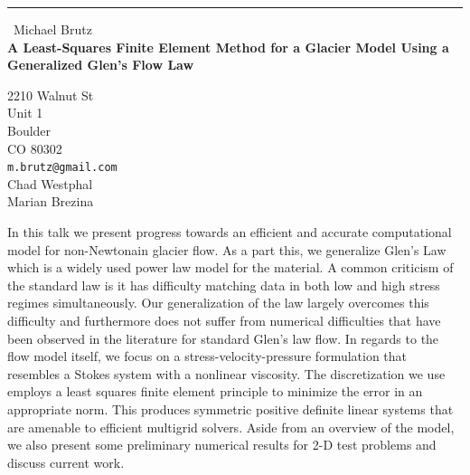 \documentclass{report}
\begin{document}
\begin{center}
\rule{6in}{1pt} \
{\large Michael Brutz \\
{\bf A Least-Squares Finite Element Method for a Glacier Model Using a Generalized Glen's Flow Law}}

2210 Walnut St \\ Unit 1 \\ Boulder \\ CO 80302
\\
{\tt m.brutz@gmail.com}\\
Chad Westphal\\
Marian Brezina\end{center}

In this talk we present progress towards an efficient and accurate
computational model for non-Newtonain glacier flow. As a part this, we
generalize Glen's Law which is a widely used power law model for the
material. A common criticism of the standard law is it has difficulty
matching data in both low and high stress regimes simultaneously. Our
generalization of the law largely overcomes this difficulty and
furthermore does not suffer from numerical difficulties that have been
observed in the literature for standard Glen's law flow. In regards to
the flow model itself, we focus on a stress-velocity-pressure formulation
that resembles a Stokes system with a nonlinear viscosity. The
discretization we use employs a least squares finite element principle to
minimize the error in an appropriate norm. This produces symmetric
positive definite linear systems that are amenable to efficient multigrid
solvers. Aside from an overview of the model, we also present some
preliminary numerical results for 2-D test problems and discuss current
work.
\end{document}
